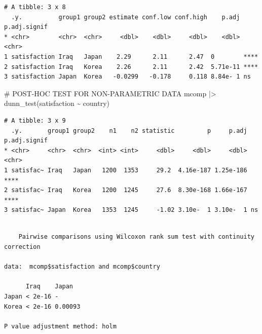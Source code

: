 \documentclass[
  letterpaper,
  DIV=11,
  numbers=noendperiod]{scrreprt}
\newenvironment{Shaded}{\begin{snugshade}}{\end{snugshade}}
\newcommand{\AlertTok}[1]{\textcolor[rgb]{0.68,0.00,0.00}{#1}}
\newcommand{\AttributeTok}[1]{\textcolor[rgb]{0.40,0.45,0.13}{#1}}
\newcommand{\CommentTok}[1]{\textcolor[rgb]{0.37,0.37,0.37}{#1}}
\newcommand{\FunctionTok}[1]{\textcolor[rgb]{0.28,0.35,0.67}{#1}}
\newcommand{\NormalTok}[1]{\textcolor[rgb]{0.00,0.23,0.31}{#1}}
\newcommand{\SpecialCharTok}[1]{\textcolor[rgb]{0.37,0.37,0.37}{#1}}
\newcommand{\StringTok}[1]{\textcolor[rgb]{0.13,0.47,0.30}{#1}}
\begin{document}
\begin{verbatim}
# A tibble: 3 x 8
  .y.          group1 group2 estimate conf.low conf.high    p.adj p.adj.signif
* <chr>        <chr>  <chr>     <dbl>    <dbl>     <dbl>    <dbl> <chr>       
1 satisfaction Iraq   Japan    2.29      2.11      2.47  0        ****        
2 satisfaction Iraq   Korea    2.26      2.11      2.42  5.71e-11 ****        
3 satisfaction Japan  Korea   -0.0299   -0.178     0.118 8.84e- 1 ns          
\end{verbatim}

\begin{Shaded}
\begin{Highlighting}[]
\CommentTok{\# POST{-}HOC }\AlertTok{TEST}\CommentTok{ FOR NON{-}PARAMETRIC DATA}
\NormalTok{mcomp }\SpecialCharTok{|\textgreater{}} \FunctionTok{dunn\_test}\NormalTok{(satisfaction }\SpecialCharTok{\textasciitilde{}}\NormalTok{ country)}
\end{Highlighting}
\end{Shaded}

\begin{verbatim}
# A tibble: 3 x 9
  .y.       group1 group2    n1    n2 statistic         p     p.adj p.adj.signif
* <chr>     <chr>  <chr>  <int> <int>     <dbl>     <dbl>     <dbl> <chr>       
1 satisfac~ Iraq   Japan   1200  1353     29.2  4.16e-187 1.25e-186 ****        
2 satisfac~ Iraq   Korea   1200  1245     27.6  8.30e-168 1.66e-167 ****        
3 satisfac~ Japan  Korea   1353  1245     -1.02 3.10e-  1 3.10e-  1 ns          
\end{verbatim}

\begin{Shaded}
\end{Shaded}

\begin{verbatim}

    Pairwise comparisons using Wilcoxon rank sum test with continuity correction 

data:  mcomp$satisfaction and mcomp$country 

      Iraq    Japan  
Japan < 2e-16 -      
Korea < 2e-16 0.00093

P value adjustment method: holm 
\end{verbatim}
\end{document}
